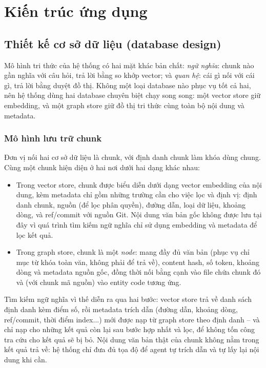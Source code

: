 \section{Kiến trúc ứng dụng}


\subsection{Thiết kế cơ sở dữ liệu (database design)}



Mô hình tri thức của hệ thống có hai mặt khác bản chất: \textit{ngữ nghĩa}: chunk nào gần nghĩa với câu hỏi, trả lời bằng so khớp vector; và \textit{quan hệ}: cái gì nối với cái gì, trả lời bằng duyệt đồ thị. Không một loại database nào phục vụ tốt cả hai, nên hệ thống dùng hai database chuyên biệt chạy song song: một vector store giữ embedding, và một graph store giữ đồ thị tri thức cùng toàn bộ nội dung và metadata.

\subsubsection{Mô hình lưu trữ chunk}

Đơn vị nối hai cơ sở dữ liệu là chunk, với định danh chunk làm khóa dùng chung. Cùng một chunk hiện diện ở hai nơi dưới hai dạng khác nhau:

\begin{itemize}
  \item Trong vector store, chunk được biểu diễn dưới dạng vector embedding của nội dung, kèm metadata chỉ gồm những trường cần cho việc lọc và định vị: định danh chunk, nguồn (để lọc phân quyền), đường dẫn, loại dữ liệu, khoảng dòng, và ref/commit với nguồn Git. Nội dung văn bản gốc không được lưu tại đây vì quá trình tìm kiếm ngữ nghĩa chỉ sử dụng embedding và metadata để lọc kết quả.
  \item Trong graph store, chunk là một \textit{node}: mang đầy đủ văn bản (phục vụ chỉ mục từ khóa toàn văn, không phải để trả về), content hash, số token, khoảng dòng và metadata nguồn gốc, đồng thời nối bằng cạnh vào file chứa chunk đó và (với chunk mã nguồn) vào entity code tương ứng.
\end{itemize}

Tìm kiếm ngữ nghĩa vì thế diễn ra qua hai bước: vector store trả về danh sách định danh kèm điểm số, rồi metadata trích dẫn (đường dẫn, khoảng dòng, ref/commit, thời điểm index...) mới được nạp từ graph store theo định danh -- và chỉ nạp cho những kết quả còn lại sau bước hợp nhất và lọc, để không tốn công tra cứu cho kết quả sẽ bị bỏ. Nội dung văn bản thật của chunk không nằm trong kết quả trả về: hệ thống chỉ đưa đủ tọa độ để agent tự trích dẫn và tự lấy lại nội dung khi cần.

